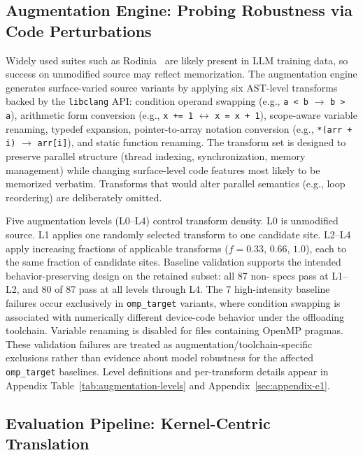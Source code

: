 \subsection{Augmentation Engine: Probing Robustness via Code Perturbations}
\label{sec:augmentation-engine}

Widely used suites such as Rodinia~\cite{Rodinia2009} are likely present in LLM training data, so success on unmodified source may reflect memorization. The augmentation engine generates surface-varied source variants by applying six AST-level transforms backed by the \texttt{libclang} API: condition operand swapping (e.g., \texttt{a < b} $\to$ \texttt{b > a}), arithmetic form conversion (e.g., \texttt{x += 1} $\leftrightarrow$ \texttt{x = x + 1}), scope-aware variable renaming, typedef expansion, pointer-to-array notation conversion (e.g., \texttt{*(arr + i)} $\to$ \texttt{arr[i]}), and static function renaming. The transform set is designed to preserve parallel structure (thread indexing, synchronization, memory management) while changing surface-level code features most likely to be memorized verbatim. Transforms that would alter parallel semantics (e.g., loop reordering) are deliberately omitted.

Five augmentation levels (L0--L4) control transform density. L0 is unmodified source. L1 applies one randomly selected transform to one candidate site. L2--L4 apply increasing fractions of applicable transforms ($f{=}0.33$, $0.66$, $1.0$), each to the same fraction of candidate sites. Baseline validation supports the intended behavior-preserving design on the retained subset: all 87 non-\knownfail{} specs pass at L1--L2, and 80 of 87 pass at all levels through L4. The 7 high-intensity baseline failures occur exclusively in \texttt{omp\_target} variants, where condition swapping is associated with numerically different device-code behavior under the offloading toolchain. Variable renaming is disabled for files containing OpenMP pragmas. These validation failures are treated as augmentation/toolchain-specific exclusions rather than evidence about model robustness for the affected \texttt{omp\_target} baselines. Level definitions and per-transform details appear in Appendix Table~\ref{tab:augmentation-levels} and Appendix~\ref{sec:appendix-e1}.


\subsection{Evaluation Pipeline: Kernel-Centric Translation}
\label{sec:eval-pipeline}

